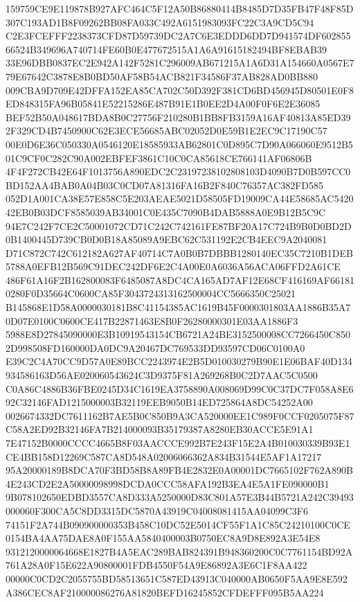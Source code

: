 \documentclass[UTF8,fontset=fandol,zihao=-4,a4paper]{ctexart}
\begin{document}
{{159759CE9E119878B927AFC464C5F12A50B86880414B8485D7D35FB47F48F85D307C193AD1B8F09262BB08FA033C492A6151983093FC22C3A9CD5C94
C2E3FCEFFF2238373CFD87D59739DC2A7C6E3EDDD6DD7D941574DF60285566524B349696A740714FE60B0E477672515A1A6A91615182494BF8EBAB39
33E96DBB0837EC2E942A142F5281C296009AB671215A1A6D31A154660A0567E779E67642C3878E8B0BD50AF58B54ACB821F34586F37AB828AD0BB880
009CBA9D709E42DFFA152EA85CA702C50D392F381CD6BD456945D80501E0F8ED848315FA96B05841E52215286E487B91E1B0EE2D4A00F0F6E2E36085
BEF52B50A048617BDA8B0C27756F210280B1BB8FB3159A16AF40813A85ED392F329CD4B7450900C62E3ECE56685ABC02052D0E59B1E2EC9C17190C57
00E0D6E36C050330A0546120E18585933AB62801C0D895C7D90A066060E9512B501C9CF0C282C90A002EBFEF3861C10C0CA85618CE766141AF06806B
4F4F272CB42E64F1013756A890EDC2C23197238102808103D4090B7D0B597CC0BD152AA4BAB0A04B03C0CD07A81316FA16B2F840C76357AC382FD585
052D1A001CA38E57E858C5E203AEAE5021D58505FD19009CA44E58685AC542042EB0B03DCF8585039AB34001C0E435C7090B4DAB5888A0E9B12B5C9C
94E7C242F7CE2C50001072CD71C242C742161FE87BF20A17C724B9B0D0BD2D0B1400445D739CB0D0B18A85089A9EBC62C531192E2CB4EEC9A2040081
D71C872C742C612182A627AF40714C7A0B0B7DBBB1280140EC35C7210B1DEB5788A0EFB12B569C91DEC242DF6E2C4A00E0A6036A56ACA06FFD2A61CE
486F61A16F2B162800083F6485087A8DC4CA165AD7AF12E68CF416169AF661810280F0D35664C0600CA85F3043724313162500004CC5666350C25021
B145868E1D58A0000030181B8C41154385AC1619B45F0000301803AA1886B35A70D07E0100C0600CE417B22871463E8B0F26280000301E03AA1886F3
5988E8D27845090000E3B10919543154CB6721A24BE3152500008CC7266450C8502D998508FD160000DA0DC9A20467DC769533DD93597CD06C0100A0
E39C2C4A70CC9D57A0E89BCC2243974E2B5D010030279B90E1E06BAF40D134934586163D56AE020060543624C3D9375F81A269268B0C2D7AAC5C0500
C0A86C4886B36FBE0245D34C1619EA3758890A008069D99C0C37DC7F058A8E692C32146FAD1215000003B32119EEB9050B14ED725864A8DC54252A00
0026674332DC7611162B7AE5B0C850B9A3CA520000EE1C989F0CCF0205075F87C58A2ED92B32146FA7B214000093B35179387A8280EB30ACCE5E91A1
7E47152B0000CCCC4665B8F03AACCCE992B7E243F15E2A4B010030339B93E1CE4BB158D12269C587CA8D548A02006066362A834B31544E5AF1A17217
95A20000189B8DCA70F3BD58B8A89FB4E2832E0A00001DC7665102F762A890B4E243CD2E2A50000098998DCDA0CCC58AFA192B3EA4E5A1FE090000B1
9B078102650EDBD3557CA8D333A5250000D83C801A57E3B44B5721A242C39493000060F300CA5C8DD3315DC5870A43919C04008081415AA04099C3F6
74151F2A744B090900000353B458C10DC52E5014CF55F1A1C85C24210100C0CE0154BA4AA75DAE8A0F155AA5840400003B0750EC8A9D8E892A3E54E8
9312120000064668E1827B4A5EAC289BAB824391B948360200C0C7761154BD92A761A28A0F15E622A90800001FDB4550F54A9E86892A3E6C1F8AA422
00000C0CD2C2055755BD58513651C587ED43913C040000AB0650F5AA9E8E592A386CEC8AF210000086276A81820BEFD16245852CFDEFFF095B5AA224
}}
\end{document}
